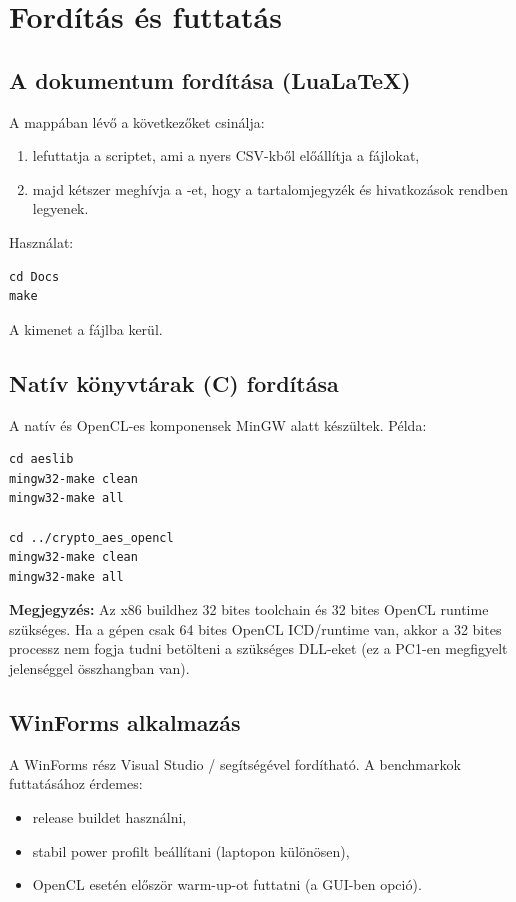 \chapter{Fordítás és futtatás}

\section{A dokumentum fordítása (LuaLaTeX)}

A  mappában lévő  a következőket csinálja:

\begin{enumerate}
  \item lefuttatja a  scriptet, ami a nyers CSV-kből előállítja a  fájlokat,
  \item majd kétszer meghívja a -et, hogy a tartalomjegyzék és hivatkozások rendben legyenek.
\end{enumerate}

Használat:

\begin{verbatim}
cd Docs
make
\end{verbatim}

A kimenet a  fájlba kerül.

\section{Natív könyvtárak (C) fordítása}

A natív és OpenCL-es komponensek MinGW alatt készültek. Példa:

\begin{verbatim}
cd aeslib
mingw32-make clean
mingw32-make all

cd ../crypto_aes_opencl
mingw32-make clean
mingw32-make all
\end{verbatim}

\textbf{Megjegyzés:} Az x86 buildhez 32 bites toolchain és 32 bites OpenCL runtime szükséges.
Ha a gépen csak 64 bites OpenCL ICD/runtime van, akkor a 32 bites processz nem fogja tudni betölteni
a szükséges DLL-eket (ez a PC1-en megfigyelt jelenséggel összhangban van).

\section{WinForms alkalmazás}

A WinForms rész Visual Studio /  segítségével fordítható.
A benchmarkok futtatásához érdemes:

\begin{itemize}
  \item release buildet használni,
  \item stabil power profilt beállítani (laptopon különösen),
  \item OpenCL esetén először warm-up-ot futtatni (a GUI-ben opció).
\end{itemize}

